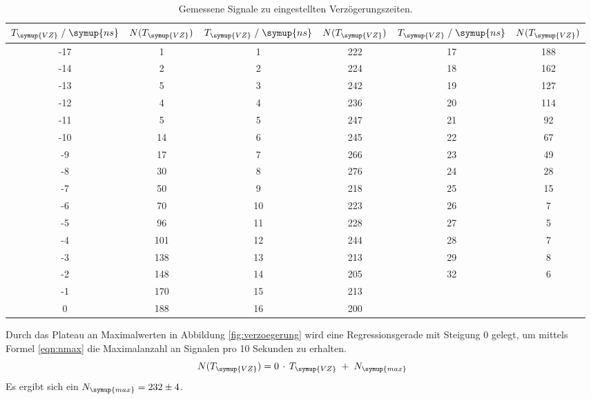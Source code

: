 \begin{table}
  \centering
  \caption{Gemessene Signale zu eingestellten Verzögerungszeiten.}
  \label{tab:verzoegerung}
  \begin{tabular}{c c | c c | c c}
    \toprule
    $T_{\symup{VZ}}\;/\;\symup{ns}$ & $N(T_{\symup{VZ}})$ &
    $T_{\symup{VZ}}\;/\;\symup{ns}$ & $N(T_{\symup{VZ}})$ & $T_{\symup{VZ}}\;/\;\symup{ns}$ & $N(T_{\symup{VZ}})$\\
    \midrule
    -17 &  1  & 1  & 222  & 17 & 188 \\
    -14 &  2  & 2  & 224  & 18 & 162 \\
    -13 &  5  & 3  & 242  & 19 & 127 \\
    -12 &  4  & 4  & 236  & 20 & 114 \\
    -11 &  5  & 5  & 247  & 21 & 92  \\
    -10 &  14 & 6  & 245  & 22 & 67  \\
    -9  & 17  & 7  & 266  & 23 & 49  \\
    -8  & 30  & 8  & 276  & 24 & 28  \\
    -7  & 50  & 9  & 218  & 25 & 15  \\
    -6  & 70  & 10 &  223 & 26 & 7   \\
    -5  & 96  & 11 &  228 & 27 & 5   \\
    -4  & 101 & 12 &  244 & 28 & 7   \\
    -3  & 138 & 13 &  213 & 29 & 8   \\
    -2  & 148 & 14 &  205 & 32 & 6   \\
    -1  & 170 & 15 &  213            \\
     0  & 188 & 16 &  200            \\
    \bottomrule
  \end{tabular}
\end{table}

Durch das Plateau an Maximalwerten in Abbildung \ref{fig:verzoegerung} wird eine
Regressionsgerade mit Steigung 0 gelegt, um mittels Formel \ref{eqn:nmax} die
Maximalanzahl an Signalen pro 10 Sekunden zu erhalten.
\begin{equation}
  N(T_{\symup{VZ}}) = 0\,\cdot\,T_{\symup{VZ}}\;+\;N_{\symup{max}}
  \label{eqn:nmax}
\end{equation}
Es ergibt sich ein $N_{\symup{max}} = 232 \pm 4$.

